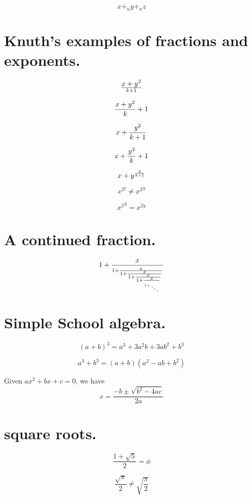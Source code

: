 $$x +_n y +_n z$$


\section{Knuth's examples of fractions and exponents. }


$$x+y^2\over k+1$$

$${x+y^2\over k}+1$$

$$x+{y^2\over k+1}$$

$$x+{y^2\over k}+1$$

$$x+y^{2\over k+1}$$

$$x^{2^y} \neq {x^2}^y$$

$${x^2}^y = x^{2y}$$



\section{A continued fraction. }

\[ 
1+  {x \over
 {\scriptstyle 1+ {\scriptstyle x \over
 {\scriptstyle 1 + {\scriptstyle x \over
 {\scriptstyle 1 + {\scriptstyle x \over
 {\scriptstyle 1+ {\scriptstyle x \over
1+{\scriptstyle
  \atop \ddots }}}}}}}}}}
\]



\section{Simple  School  algebra.   }

$$(a+b)^3=a^3+3a^2b+3ab^2+b^3$$

$$a^3+b^3=(a+b)(a^2-ab+b^2)$$

Given $ax^2+bx+c=0$, we have
$$x= \frac{-b \pm \sqrt{b^2-4ac}}{2a}$$



\section{square roots.  }

$$\frac{1+\sqrt{5}}{2}=\phi$$

$$\frac{\sqrt{\pi}}{2} \neq \sqrt{\frac{\pi}{2}}$$

